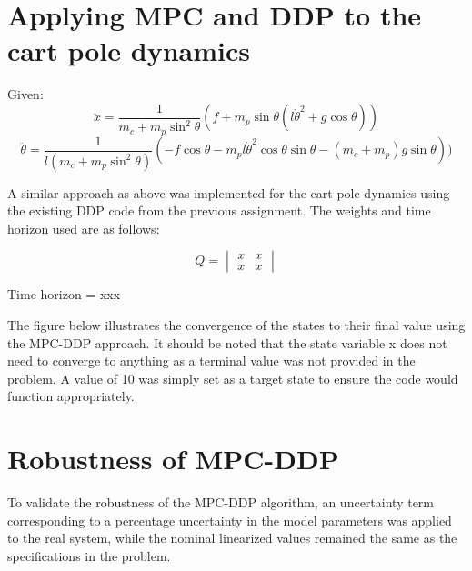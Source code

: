 \documentclass{article}
\begin{document}
\section{Applying MPC and DDP to the cart pole dynamics}

Given:
\begin{equation}
\ddot{x} = \frac{1}{m_c + m_p{\sin}^2\theta}(f + m_p \sin\theta(l{\dot{\theta}}^2 + g\cos\theta))
\end{equation}
\begin{equation}
\ddot{\theta} = \frac{1}{l(m_c + m_p{\sin}^2{\theta})}(-f\cos\theta - 				m_pl{\dot{\theta}}^2\cos{\theta}\sin{\theta} - (m_c + m_p)g\sin\theta))
\end{equation}


A similar approach as above was implemented for the cart pole dynamics using 		the existing DDP code from the previous assignment. The weights and time 			horizon used are as follows:

$$
Q = 
\begin{vmatrix}
x & x \\ x & x
\end{vmatrix}
$$

\begin{center}
Time horizon = xxx
\end{center}

The figure below illustrates the convergence of the states to their final value using the MPC-DDP approach. It should be noted that the state variable x does not need to converge to anything as a terminal value was not provided in the problem. A value of 10 was simply set as a target state to ensure the code would function appropriately.

\section{Robustness of MPC-DDP}

To validate the robustness of the MPC-DDP algorithm, an uncertainty term corresponding to a percentage uncertainty in the model parameters was applied to the real system, while the nominal linearized values remained the same as the specifications in the problem.
\end{document}
